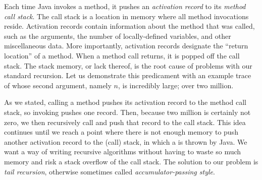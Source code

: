 Each time Java invokes a method, it pushes an \textit{activation record} to its \textit{method call stack}. The call stack is a location in memory where all method invocations reside. Activation records contain information about the method that was called, such as the arguments, the number of locally-defined variables, and other miscellaneous data. More importantly, activation records designate the ``return location'' of a method. When a method call returns, it is popped off the call stack. The stack memory, or lack thereof, is the root cause of problems with our standard recursion. Let us demonstrate this predicament with an example trace of  whose second argument, namely $n$, is incredibly large; over two million.

As we stated, calling a method pushes its activation record to the method call stack, so invoking  pushes one record. Then, because two million is certainly not zero, we then recursively call  and push that record to the call stack. This idea continues until we reach a point where there is not enough memory to push another activation record to the (call) stack, in which a  is thrown by Java. We want a way of writing recursive algorithms without having to waste so much memory and risk a stack overflow of the call stack. The solution to our problem is \textit{tail recursion}, otherwise sometimes called \textit{accumulator-passing style}.

